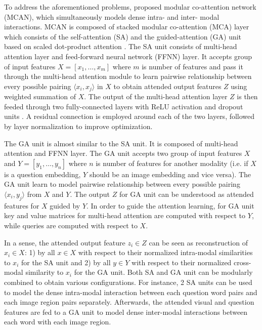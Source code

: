 \documentclass{article}
\begin{document}
To address the aforementioned problems, \citet{yu2019mcan} proposed modular co-attention network (MCAN), which simultaneously models dense intra- and inter- modal interactions. MCAN is composed of stacked modular co-attention (MCA) layer which consists of the self-attention (SA) and the guided-attention (GA) unit based on scaled dot-product attention \citep{transformers}. The SA unit consists of multi-head attention layer and feed-forward neural network (FFNN) layer. It accepts group of input features $X = [x_{1}, \dots, x_{m}]$ where $m$ is number of features and pass it through the multi-head attention module to learn pairwise relationship between every possible pairing $\langle x_{i},x_{j} \rangle$ in $X$ to obtain attended output features $Z$ using weighted summation of $X$. The output of the multi-head attention layer $Z$ is then feeded through two fully-connected layers with ReLU activation \citep{relu} and dropout units \citep{dropout}. A residual connection \citep{residual} is employed around each of the two layers, followed by layer normalization \citep{ba2016layer} to improve optimization.

The GA unit is almost similar to the SA unit. It is composed of multi-head attention and FFNN layer. The GA unit accepts two group of input features $X$ and $Y = [y_{1}, \dots, y_{n}]$ where $n$ is number of features for another modality (i.e. if $X$ is a question embedding, $Y$ should be an image embedding and vice versa). The GA unit learn to model pairwise relationship between every possible pairing $\langle x_{i},y_{j} \rangle$ from $X$ and $Y$. The output $Z$ for GA unit can be understood as attended features for $X$ guided by $Y$. In order to guide the attention learning, for GA unit key and value matrices for multi-head attention are computed with respect to $Y$, while queries are computed with respect to $X$. 

In a sense, the attended output feature $z_{i} \in Z$ can be seen as reconstruction of $x_{i} \in X$: 1) by all $x \in X$ with respect to their normalized intra-modal similarities to $x_{i}$ for the SA unit and 2) by all $y \in Y$ with respect to their normalized cross-modal similarity to $x_{i}$ for the GA unit. Both SA and GA unit can be modularly combined to obtain various configurations. For instance, 2 SA units can be used to model the dense intra-modal interaction between each question word pairs and each image region pairs separately. Afterwards, the attended visual and question features are fed to a GA unit to model dense inter-modal interactions between each word with each image region. 
\end{document}

